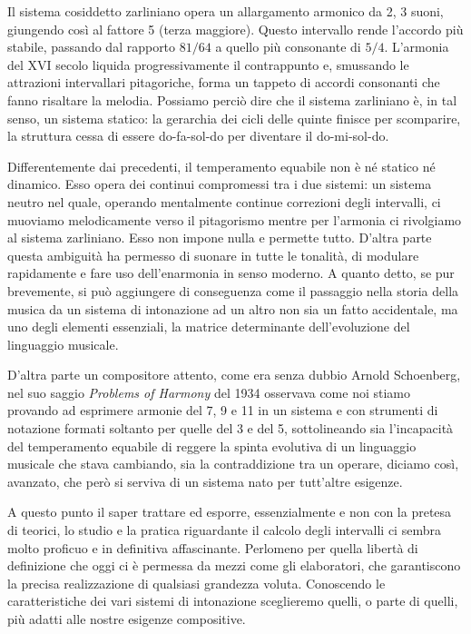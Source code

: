 Il sistema cosiddetto zarliniano opera un allargamento armonico da 2, 3 suoni,
giungendo così al fattore 5 (terza maggiore). Questo intervallo rende l'accordo
più stabile, passando dal rapporto $81/64$ a quello più consonante di $5/4$.
L'armonia del XVI secolo liquida progressivamente il contrappunto e, smussando
le attrazioni intervallari pitagoriche, forma un tappeto di accordi consonanti
che fanno risaltare la melodia. Possiamo perciò dire che il sistema zarliniano
è, in tal senso, un sistema statico: la gerarchia dei cicli delle quinte finisce
per scomparire, la struttura cessa di essere do-fa-sol-do per diventare il
do-mi-sol-do.

Differentemente dai precedenti, il temperamento equabile non è né statico né
dinamico. Esso opera dei continui compromessi tra i due sistemi: un sistema
neutro nel quale, operando mentalmente continue correzioni degli intervalli, ci
muoviamo melodicamente verso il pitagorismo mentre per l'armonia ci rivolgiamo
al sistema zarliniano. Esso non impone nulla e permette tutto. D'altra parte
questa ambiguità ha permesso di suonare in tutte le tonalità, di modulare
rapidamente e fare uso dell'enarmonia in senso moderno. A quanto detto, se pur
brevemente, si può aggiungere di conseguenza come il passaggio nella storia
della musica da un sistema di intonazione ad un altro non sia un fatto
accidentale, ma uno degli elementi essenziali, la matrice determinante
dell'evoluzione del linguaggio musicale.

D'altra parte un compositore attento, come era senza dubbio Arnold Schoenberg,
nel suo saggio \emph{Problems of Harmony} del 1934 osservava come noi stiamo
provando ad esprimere armonie del 7, 9 e 11 in un sistema e con strumenti di
notazione formati soltanto per quelle del 3 e del 5, sottolineando sia
l'incapacità del temperamento equabile di reggere la spinta evolutiva di un
linguaggio musicale che stava cambiando, sia la contraddizione tra un operare,
diciamo così, avanzato, che però si serviva di un sistema nato per tutt'altre
esigenze.

A questo punto il saper trattare ed esporre, essenzialmente e non con la pretesa
di teorici, lo studio e la pratica riguardante il calcolo degli intervalli ci
sembra molto proficuo e in definitiva affascinante. Perlomeno per quella libertà
di definizione che oggi ci è permessa da mezzi come gli elaboratori, che
garantiscono la precisa realizzazione di qualsiasi grandezza voluta. Conoscendo
le caratteristiche dei vari sistemi di intonazione sceglieremo quelli, o parte
di quelli, più adatti alle nostre esigenze compositive.

